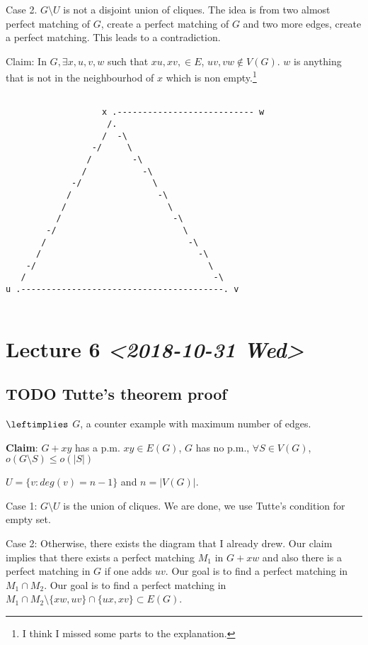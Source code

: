 \documentclass[11pt]{article}
\begin{document}
Case 2. \(G \setminus U\) is not a disjoint union of cliques. The idea is from
two almost perfect matching of \(G\), create a perfect matching of \(G\) and two
more edges, create a perfect matching. This leads to a contradiction. 

Claim: In \(G, \exists x, u, v, w\) such that \(xu, xv, \in E\), \(uv, vw \notin
   V(G)\). \(w\) is anything that is not in the neighbourhod of \(x\) which is non
empty.\footnote{I think I missed some parts to the explanation.}

\begin{verbatim}

                   x .--------------------------- w
                    /.
                   /  -\                           
                 -/     \                          
                /        -\                        
               /           -\                      
             -/              \                     
            /                 -\                   
           /                    \                  
          /                      -\                
        -/                         \               
       /                            -\             
      /                               -\           
    -/                                  \          
   /                                     -\        
u .----------------------------------------. v


\end{verbatim}
\section{Lecture 6 \textit{<2018-10-31 Wed>}}
\label{sec:orga666701}
\subsection{{\bfseries\sffamily TODO} Tutte's theorem proof}
\label{sec:org18910de}
\(\leftimplies\) \(G\), a counter example with maximum number of edges.

\textbf{Claim}: \(G+xy\) has a p.m. \(xy\in E(G)\), \(G\) has no p.m., \(\forall S \in
    V(G)\), \(o(G \setminus S) \le o(\vert S \vert)\)

\(U = \{v \colon deg(v) = n-1\}\) and \(n=\vert V(G)\vert\).

Case 1: \(G \setminus U\) is the union of cliques. We are done, we use Tutte's
condition for empty set. 

Case 2: Otherwise, there exists the diagram that I already drew. Our claim
implies that there exists a perfect matching \(M_1\) in \(G + xw\) and also
there is a perfect matching in \(G\) if one adds \(uv\). Our goal is to find a
perfect matching in \(M_1 \cap M_2\). Our goal is to find a perfect matching
in \(M_1 \cap M_2 \setminus \{xw, uv\} \cap \{ux, xv\} \subset E(G)\).
\end{document}
